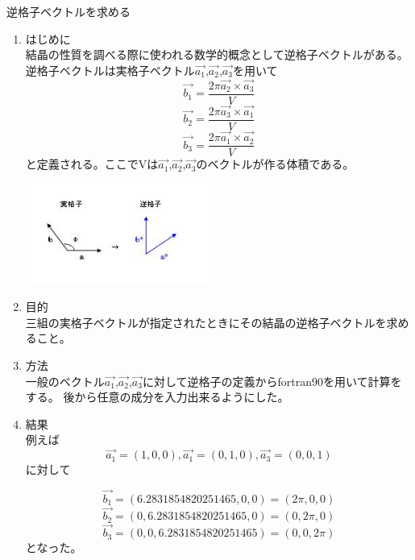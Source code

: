 \documentclass{jarticle}
\begin{document}
\begin{flushleft}
{\large
 逆格子ベクトルを求める}
\begin{enumerate}
\item はじめに
     \\結晶の性質を調べる際に使われる数学的概念として逆格子ベクトルがある。
     \\逆格子ベクトルは実格子ベクトル$\vec{a_1}$,$\vec{a_2}$,$\vec{a_3}$を用いて
 \begin{equation}
   \vec{b_1}=\frac{2\pi\vec{a_2}×\vec{a_3}}{V}
 \end{equation}
 \begin{equation}
   \vec{b_2}=\frac{2\pi\vec{a_3}×\vec{a_1}}{V}
 \end{equation}
 \begin{equation}
   \vec{b_3}=\frac{2\pi\vec{a_1}×\vec{a_2}}{V}
 \end{equation}
 と定義される。ここでVは$\vec{a_1}$,$\vec{a_2}$,$\vec{a_3}$のベクトルが作る体積である。
 \begin{center}
 \includegraphics[width=6cm]{lattice.jpg}
 \end{center}
\item 目的
\\三組の実格子ベクトルが指定されたときにその結晶の逆格子ベクトルを求めること。
\item 方法
\\一般のベクトル$\vec{a_1}$,$\vec{a_2}$,$\vec{a_3}$に対して逆格子の定義からfortran90を用いて計算をする。
後から任意の成分を入力出来るようにした。
\item 結果
\\例えば
\begin{equation}
  \vec{a_1}=(1,0,0),\vec{a_1}=(0,1,0),\vec{a_3}=(0,0,1)
\end{equation}
に対して

  \begin{equation}
    \vec{b_1}=(6.2831854820251465,0,0)=(2\pi,0,0)
  \end{equation}
  \begin{equation}
    \vec{b_2}=(0,6.2831854820251465,0)=(0,2\pi,0)
  \end{equation}
  \begin{equation}
    \vec{b_3}=(0,0,6.2831854820251465)=(0,0,2\pi)
  \end{equation}
となった。
\end{enumerate}




\end{flushleft}
\end{document}
